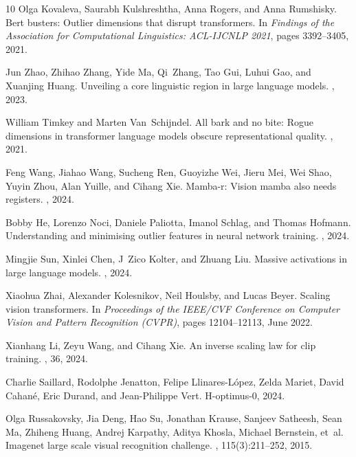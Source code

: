 \documentclass[conference]{IEEEtran}
\begin{document}
\begin{thebibliography}{10}
Olga Kovaleva, Saurabh Kulshreshtha, Anna Rogers, and Anna Rumshisky.
\newblock Bert busters: Outlier dimensions that disrupt transformers.
\newblock In {\em Findings of the Association for Computational Linguistics: ACL-IJCNLP 2021}, pages 3392--3405, 2021.

Jun Zhao, Zhihao Zhang, Yide Ma, Qi~Zhang, Tao Gui, Luhui Gao, and Xuanjing Huang.
\newblock Unveiling a core linguistic region in large language models.
, 2023.

William Timkey and Marten Van~Schijndel.
\newblock All bark and no bite: Rogue dimensions in transformer language models obscure representational quality.
, 2021.

Feng Wang, Jiahao Wang, Sucheng Ren, Guoyizhe Wei, Jieru Mei, Wei Shao, Yuyin Zhou, Alan Yuille, and Cihang Xie.
\newblock Mamba-r: Vision mamba also needs registers.
, 2024.

Bobby He, Lorenzo Noci, Daniele Paliotta, Imanol Schlag, and Thomas Hofmann.
\newblock Understanding and minimising outlier features in neural network training.
, 2024.

Mingjie Sun, Xinlei Chen, J~Zico Kolter, and Zhuang Liu.
\newblock Massive activations in large language models.
, 2024.

Xiaohua Zhai, Alexander Kolesnikov, Neil Houlsby, and Lucas Beyer.
\newblock Scaling vision transformers.
\newblock In {\em Proceedings of the IEEE/CVF Conference on Computer Vision and Pattern Recognition (CVPR)}, pages 12104--12113, June 2022.

Xianhang Li, Zeyu Wang, and Cihang Xie.
\newblock An inverse scaling law for clip training.
, 36, 2024.

Charlie Saillard, Rodolphe Jenatton, Felipe Llinares-López, Zelda Mariet, David Cahané, Eric Durand, and Jean-Philippe Vert.
\newblock H-optimus-0, 2024.

Olga Russakovsky, Jia Deng, Hao Su, Jonathan Krause, Sanjeev Satheesh, Sean Ma, Zhiheng Huang, Andrej Karpathy, Aditya Khosla, Michael Bernstein, et~al.
\newblock Imagenet large scale visual recognition challenge.
, 115(3):211--252, 2015.


\end{thebibliography}
\end{document}
